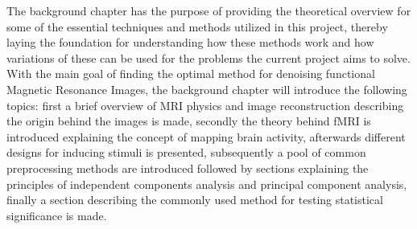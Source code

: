 
The background chapter has the purpose of providing the theoretical overview for some of the essential techniques and methods utilized in this project, thereby laying the foundation for understanding how these methods work and how variations of these can be used for the problems the current project aims to solve. With the main goal of finding the optimal method for denoising functional Magnetic Resonance Images, the background chapter will introduce the following topics: first a brief overview of MRI physics and image reconstruction describing the origin behind the images is made, secondly the theory behind fMRI is introduced explaining the concept of mapping brain activity, afterwards different designs for inducing stimuli is presented, subsequently a pool of common preprocessing methods are introduced followed by sections explaining the principles of independent components analysis and principal component analysis, finally a section describing the commonly used method for testing statistical significance is made. 